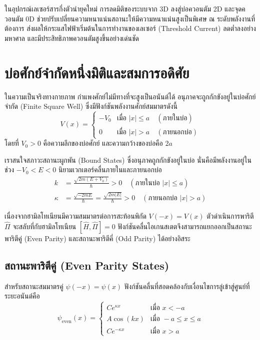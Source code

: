 ในอุปกรณ์เลเซอร์สารกึ่งตัวนำยุคใหม่ การลดมิติของระบบจาก 3D ลงสู่บ่อควอนตัม 2D และจุดควอนตัม 0D ช่วยปรับเปลี่ยนความหนาแน่นสถานะให้มีความหนาแน่นสูงเป็นพิเศษ ณ ระดับพลังงานที่ต้องการ ส่งผลให้กระแสไฟฟ้าเริ่มต้นในการทำงานของเลเซอร์ (Threshold Current) ลดต่ำลงอย่างมหาศาล และมีประสิทธิภาพควอนตัมสูงขึ้นอย่างเด่นชัด

\section{บ่อศักย์จำกัดหนึ่งมิติและสมการอดิศัย}
\label{sec_finite_well}

ในความเป็นจริงทางกายภาพ กำแพงศักย์ไม่มีทางที่จะสูงเป็นอนันต์ได้ อนุภาคจะถูกกักขังอยู่ในบ่อศักย์จำกัด (Finite Square Well) ซึ่งมีฟังก์ชันพลังงานศักย์สมมาตรดังนี้
\begin{equation}
V(x) = \begin{cases}
-V_0 & \text{เมื่อ } |x| \le a \quad (\text{ภายในบ่อ}) \\
0 & \text{เมื่อ } |x| > a \quad (\text{ภายนอกบ่อ})
\end{cases}
\end{equation}
โดยที่ $V_0 > 0$ คือความลึกของบ่อศักย์ และความกว้างของบ่อคือ $2a$

เราสนใจสภาวะสถานะผูกพัน (Bound States) ซึ่งอนุภาคถูกกักขังอยู่ในบ่อ นั่นคือมีพลังงานอยู่ในช่วง $-V_0 < E < 0$ นิยามเวกเตอร์คลื่นภายในและภายนอกบ่อ
\begin{align}
k &= \frac{\sqrt{2m(E + V_0)}}{\hbar} > 0 \quad (\text{ภายในบ่อ } |x| \le a) \\
\kappa &= \frac{\sqrt{-2mE}}{\hbar} = \frac{\sqrt{2m|E|}}{\hbar} > 0 \quad (\text{ภายนอกบ่อ } |x| > a)
\end{align}

เนื่องจากฮามิลโทเนียนมีความสมมาตรต่อการสะท้อนพิกัด $V(-x) = V(x)$ ตัวดำเนินการพาริตี $\hat{\Pi}$ จะสลับที่กับฮามิลโทเนียน $[\hat{H}, \hat{\Pi}] = 0$ ฟังก์ชันคลื่นไอเกนสเตตจึงสามารถแยกออกเป็นสถานะพาริตีคู่ (Even Parity) และสถานะพาริตีคี่ (Odd Parity) ได้อย่างอิสระ

\subsection{สถานะพาริตีคู่ (Even Parity States)}
สำหรับสถานะสมมาตรคู่ $\psi(-x) = \psi(x)$ ฟังก์ชันคลื่นที่สอดคล้องกับเงื่อนไขการลู่เข้าสู่ศูนย์ที่ระยะอนันต์คือ
\begin{equation}
\psi_{\text{even}}(x) = \begin{cases}
C e^{\kappa x} & \text{เมื่อ } x < -a \\
A \cos(kx) & \text{เมื่อ } -a \le x \le a \\
C e^{-\kappa x} & \text{เมื่อ } x > a
\end{cases}
\end{equation}

